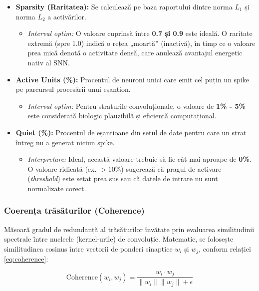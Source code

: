 \begin{itemize}
	\item \textbf{Sparsity (Raritatea):} Se calculează pe baza raportului dintre norma $L_1$ și norma $L_2$ a activărilor. 
	\begin{itemize}
		\item \textit{Interval optim:} O valoare cuprinsă între \textbf{0.7 și 0.9} este ideală. O raritate extremă (spre 1.0) indică o rețea „moartă” (inactivă), în timp ce o valoare prea mică denotă o activitate densă, care anulează avantajul energetic nativ al SNN.
	\end{itemize}
	\item \textbf{Active Units (\%):} Procentul de neuroni unici care emit cel puțin un spike pe parcursul procesării unui eșantion.
	\begin{itemize}
		\item \textit{Interval optim:} Pentru straturile convoluționale, o valoare de \textbf{1\% - 5\%} este considerată biologic plauzibilă și eficientă computațional.
	\end{itemize}
	\item \textbf{Quiet (\%):} Procentul de eșantioane din setul de date pentru care un strat întreg nu a generat niciun spike.
	\begin{itemize}
		\item \textit{Interpretare:} Ideal, această valoare trebuie să fie cât mai aproape de \textbf{0\%}. O valoare ridicată (ex. $>10\%$) sugerează că pragul de activare (\textit{threshold}) este setat prea sus sau că datele de intrare nu sunt normalizate corect.
	\end{itemize}
\end{itemize}

\subsubsection{Coerența trăsăturilor (Coherence)}
Măsoară gradul de redundanță al trăsăturilor învățate prin evaluarea similitudinii spectrale între nucleele (kernel-urile) de convoluție. Matematic, se folosește similitudinea cosinus între vectorii de ponderi sinaptice $w_i$ și $w_j$, conform relației \eqref{eq:coherence}:

\begin{equation}
	\label{eq:coherence}
	\text{Coherence}(w_i, w_j) = \frac{w_i \cdot w_j}{\|w_i\| \|w_j\| + \epsilon}
\end{equation}

